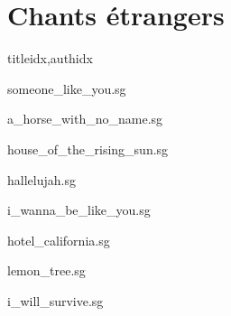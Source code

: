 \documentclass[
    ]{article}
\begin{document}
\section{Chants étrangers}

\begin{songs}{titleidx,authidx}

{someone_like_you.sg}


{a_horse_with_no_name.sg}


{house_of_the_rising_sun.sg}


{hallelujah.sg}


{i_wanna_be_like_you.sg}


{hotel_california.sg}


{lemon_tree.sg}


{i_will_survive.sg}


\end{songs}
\end{document}

